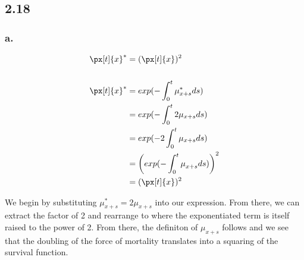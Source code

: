 \documentclass[
]{article}
\begin{document}
\hypertarget{section-3}{%
\subsection{2.18}\label{section-3}}

\hypertarget{a.-1}{%
\subsubsection{a.}\label{a.-1}}

\[
\begin{aligned}
\px[t]{x}^{*}  &=(\px[t]{x})^{2} \\ \\
\px[t]{x}^{*}  &= exp(- \int_{0}^{t} \mu_{x + s}^{*}ds) \\
&= exp(- \int_{0}^{t} 2 \mu_{x + s}ds) \\
&= exp(- 2 \int_{0}^{t} \mu_{x + s}ds) \\
&= \left(exp(-\int_{0}^{t} \mu_{x + s}^{}ds)\right)^2 \\
&= (\px[t]{x})^{2}
\end{aligned}
\]

We begin by substituting \(\mu_{x + s}^{*} = 2 \mu_{x + s}\) into our
expression. From there, we can extract the factor of 2 and rearrange to
where the exponentiated term is itself raised to the power of 2. From
there, the definiton of \(\mu_{x + s}\) follows and we see that the
doubling of the force of mortality translates into a squaring of the
survival function.
\end{document}
